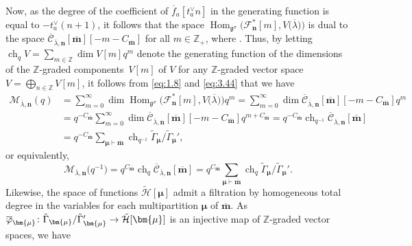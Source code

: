 \documentclass[10pt,a4paper]{amsart}
\numberwithin{equation}{section}
\DeclareMathOperator{\Hom}{Hom}
\DeclareMathOperator{\ch}{ch}
\begin{document}
Now, as the degree of the coefficient  of $\overline{f}_a[t_a^{\vee}n]$ in the generating function  is equal to $-t_a^{\vee}(n+1)$, it follows that the space $\Hom_{\mathfrak{g}^{\sigma}}\bigl(\mathcal{F}_{\mathbf{n}}^*[m],V\bigl(\overline{\lambda}\bigr)\bigr)$ is dual to the space $\overline{ \mathcal{C}}_{\overline{ \lambda},\mathbf{n}}[\overline{ \mathbf{m}}][-m-C_{\overline{\mathbf{m}}}]$ for all $m\in \mathbb{Z}_+$, where . Thus, by letting $\ch_q V=\sum_{m\in \mathbb{Z}}\dim V[m]q^m$ denote the generating function of the dimensions of the $\mathbb{Z}$-graded components~$V[m]$ of $V$ for any $\mathbb{Z}$-graded vector space $V=\bigoplus_{n\in \mathbb{Z}} V[m]$, it follows from \eqref{eq:1.8} and \eqref{eq:3.44} that we have
\begin{align*}
\mathcal{M}_{\overline{\lambda},\mathbf{n}}(q)
&=\sum_{m=0}^{\infty}\dim\Hom_{\mathfrak{g}^{\sigma}}\bigl(\mathcal{F}_{\mathbf{n}}^*[m],V\bigl(\overline{\lambda}\bigr)\bigr)q^m=\sum_{m=0}^{\infty}\dim\overline{ \mathcal{C}}_{\overline{ \lambda},\mathbf{n}}[\overline{\mathbf{m}}][-m-C_{\overline{ \mathbf{m}}}]q^m\\
&=q^{-C_{\overline{\mathbf{m}}}}\sum_{m=0}^{\infty}\dim \overline{\mathcal{C}}_{\overline{\lambda},\mathbf{n}}[\overline{\mathbf{m}}][-m-C_{\overline{\mathbf{m}}}]q^{m+C_{ \overline{\mathbf{m}}}}=q^{-C_{\overline{\mathbf{m}}}}\ch_{q^{-1}} \overline{ \mathcal{C}}_{\overline{ \lambda},\mathbf{n}}[\overline{ \mathbf{m}}]\\
&=q^{-C_{\overline{\mathbf{m}}}}\sum_{\bm{\mu}\vdash \overline{\mathbf{m}}}\ch_{q^{-1}}\tilde{\Gamma}_{\bm{\mu}}/\tilde{ \Gamma}_{\bm{\mu}}',
\end{align*}
or equivalently,
\begin{equation}\label{eq:3.46}
\mathcal{M}_{\overline{\lambda},\mathbf{n}}\bigl(q^{-1}\bigr)
=q^{C_{\overline{\mathbf{m}}}}\ch_q\overline{\mathcal{C}}_{ \overline{\lambda},\mathbf{n}}[\overline{\mathbf{m}}]
=q^{C_{\overline{\mathbf{m}}}}\sum_{\bm{\mu}\vdash\overline{ \mathbf{m}}}\ch_q\tilde{\Gamma}_{\bm{\mu}}/\tilde{\Gamma}_{ \bm{\mu}}'.
\end{equation}
Likewise, the space of functions $\tilde{\mathcal{H}}[\bm{ \mu}]$ admit a filtration by homogeneous total degree in the variables  for each multipartition $\bm{\mu}$ of $\overline{\mathbf{m}}$. As $\overline{\varphi}_{\bm{\mu}}\colon \tilde{\Gamma}_{\bm{\mu}}/\tilde{\Gamma}_{\bm{\mu}}'\to \smash{\tilde{\mathcal{H}}[\bm{\mu}]}$ is an injective map of $\mathbb{Z}$-graded vector spaces, we have
\end{document}
